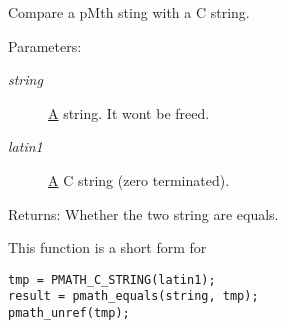 Compare a pMth sting with a C string. 

\begin{Desc}
\item[Parameters:]
\begin{description}
\item[{\em string}]\hyperlink{class_a}{A} string. It wont be freed. \item[{\em latin1}]\hyperlink{class_a}{A} C string (zero terminated). \end{description}
\end{Desc}
\begin{Desc}
\item[Returns:]Whether the two string are equals.\end{Desc}
This function is a short form for 

\begin{Code}\begin{verbatim}tmp = PMATH_C_STRING(latin1);
result = pmath_equals(string, tmp);
pmath_unref(tmp);
\end{verbatim}
\end{Code}

 